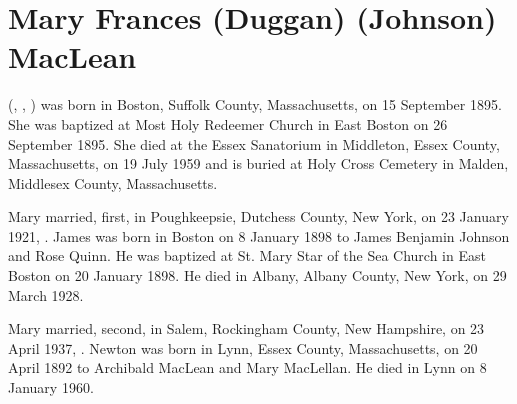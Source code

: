 \section{Mary Frances (Duggan) (Johnson) MacLean}\label{per:Mary4Duggan}

 (, , ) was born in Boston, Suffolk County, Massachusetts, on 15 September 1895.\cite{Mary4DugganBirth} She was baptized at Most Holy Redeemer Church in East Boston on 26 September 1895.\cite{Mary4DugganBaptism} She died at the Essex Sanatorium in Middleton, Essex County, Massachusetts, on 19 July 1959 and is buried at Holy Cross Cemetery in Malden, Middlesex County, Massachusetts.\cite{Mary4DugganDeath} 

Mary married, first, in Poughkeepsie, Dutchess County, New York, on 23 January 1921, .\cite{JamesJohnsonMarriage} 
James was born in Boston on 8 January 1898 to James Benjamin Johnson and Rose Quinn.\cite{JamesJohnsonBirth} He was baptized at St. Mary Star of the Sea Church in East Boston on 20 January 1898.\cite{JamesJohnsonBaptism} He died in Albany, Albany County, New York, on 29 March 1928.\cite{JamesJohnsonDeath}

Mary married, second, in Salem, Rockingham County, New Hampshire, on 23 April 1937, .\cite{NewtonMacLeanMarriage} Newton was born in Lynn, Essex County, Massachusetts, on 20 April 1892 to Archibald MacLean and Mary MacLellan.\cite{NewtonMacLeanBirth} He died in Lynn on 8 January 1960.\cite{NewtonMacLeanDeath}

